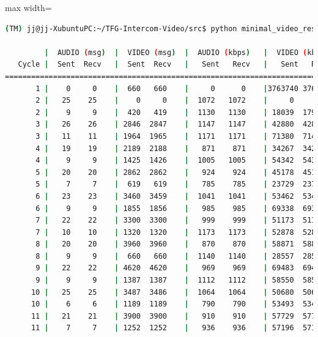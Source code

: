 \begin{adjustbox}{max width=\textwidth}
\begin{lstlisting}[language=bash,basicstyle=\ttfamily\scriptsize]
(TM) jj@jj-XubuntuPC:~/TFG-Intercom-Video/src$ python minimal_video_resolution.py --show_video --show_stats --camera_index 1 -z 12 -w 640 -g 480

         |  AUDIO (msg)  |  VIDEO (msg)  |  AUDIO (kbps)   |  VIDEO (kbps)   |     CPU (%) 
   Cycle |  Sent  Recv   |  Sent  Recv   |   Sent   Recv   |   Sent   Recv   | Program System
================================================================================================
       1 |    0     0    |  660   660    |     0      0    |3763740 3763740    |   0    100       
       2 |   25    25    |    0     0    |  1072   1072    |     0      0    |  23     73       
       2 |    9     9    |  420   419    |  1130   1130    | 18039  17996    |  46     74       
       3 |   26    26    | 2846  2847    |  1147   1147    | 42880  42895    |  53     73       
       3 |   11    11    | 1964  1965    |  1171   1171    | 71380  71417    |  55     72       
       4 |   19    19    | 2189  2188    |   871    871    | 34267  34251    |  37     76       
       4 |    9     9    | 1425  1426    |  1005   1005    | 54342  54381    |  44     78       
       5 |   20    20    | 2862  2862    |   924    924    | 45178  45178    |  43     76       
       5 |    7     7    |  619   619    |   785    785    | 23729  23729    |  41     76       
       6 |   23    23    | 3460  3459    |  1041   1041    | 53462  53447    |  52     75       
       6 |    9     9    | 1855  1856    |   985    985    | 69338  69375    |  83     74       
       7 |   22    22    | 3300  3300    |   999    999    | 51173  51173    |  66     75       
       7 |   10    10    | 1320  1320    |  1173   1173    | 52878  52878    |  50     76       
       8 |   20    20    | 3960  3960    |   870    870    | 58871  58871    |  55     74       
       8 |    9     9    |  660   660    |  1140   1140    | 28557  28557    |  50     75       
       9 |   22    22    | 4620  4620    |   969    969    | 69483  69483    |  57     74       
       9 |    9     9    | 1387  1387    |  1112   1112    | 58550  58550    |  41     72       
      10 |   25    25    | 3487  3486    |  1064   1064    | 50680  50665    |  36     72       
      10 |    6     6    | 1189  1189    |   790    790    | 53493  53493    |  48     71       
      11 |   21    21    | 3900  3900    |   910    910    | 57729  57729    |  46     72       
      11 |    7     7    | 1252  1252    |   936    936    | 57196  57196    |  40     74       

\end{lstlisting}
\end{adjustbox}
